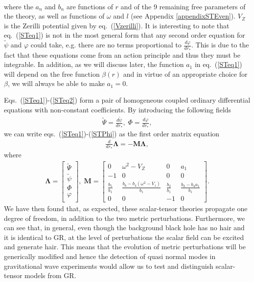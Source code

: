 \documentclass[10pt,twocolumn,preprintnumbers,amsmath,amssymb,nofootinbib
,superscriptaddress]{revtex4-1}
\begin{document}
{\begin{align}
\end{align}
where the $a_n$ and $b_n$ are functions of $r$ and of the 9 remaining free parameters of the theory, as well as functions of $\omega$ and $l$ (see Appendix \ref{appendixSTEven}). $V_Z$ is the Zerilli potential given by eq.~(\ref{Vzerilli}). It is interesting to note that eq.~(\ref{STeq1}) is not in the most general form that any second order equation for $\tilde{\psi}$ and $\varphi$ could take, e.g. there are no terms proportional to $\frac{d\varphi}{dr_\ast}$. This is due to the fact that these equations come from an action principle and thus they must be integrable.
In addition, as we will discuss later, the function $a_1$ in eq.~(\ref{STeq1}) will depend on the free function $\beta(r)$ and in virtue of an appropriate choice for $\beta$, we will always be able to make $a_1=0$. 

Eqs.~(\ref{STeq1})-(\ref{STeq2}) form a pair of homogeneous coupled ordinary differential equations with non-constant coefficients. By introducing the following fields
\begin{align}
\tilde{\Psi}=\frac{d\tilde{\psi}}{dr_\ast},\;\Phi=\frac{d\varphi}{dr_\ast},\label{STPhi}
\end{align}
we can write eqs.~(\ref{STeq1})-(\ref{STPhi}) as the first order matrix equation
\begin{align}
\frac{d}{dr_\ast}\bm{\Lambda}=-\bm{M}\bm{\Lambda},
\end{align}
where
\begin{align}
\bm{\Lambda}=\begin{bmatrix}
\tilde{\Psi}\\
\tilde{\psi}\\
\Phi\\
\varphi\\
\end{bmatrix},\;
\bm{M}=\begin{bmatrix}
0&\omega^2-V_Z&0&a_1\\
-1&0&0&0\\
\frac{b_5}{b_1}&\frac{b_6-b_4\left(\omega^2-V_z\right)}{b_1}&\frac{b_2}{b_1}&\frac{b_3-b_4a_1}{b_1}\\
0&0&-1&0
\end{bmatrix}.
\end{align}
We have then found that, as expected, these scalar-tensor theories propagate one degree of freedom, in addition to the two metric perturbations. Furthermore, we can see that, in general, even though the background black hole has no hair and it is identical to GR, at the level of perturbations the scalar field can be excited and generate hair. This means that the evolution of metric perturbations will be generically modified and hence the detection of quasi normal modes in gravitational wave experiments would allow us to test and distinguish scalar-tensor models from GR. 

}
\end{document}
